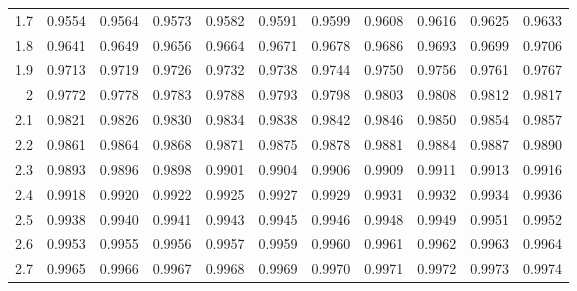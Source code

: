\begin{center}
\begin{minipage}{5in}
\begin{center}
\begin{tabular}{|r|rrrrrrrrrr|}
	\cellcolor{lightgray}1.7	&\cellcolor{lightgray}	0.9554	&\cellcolor{lightgray}	0.9564	&\cellcolor{lightgray}	0.9573	&\cellcolor{lightgray}	0.9582	&\cellcolor{lightgray}	0.9591	&\cellcolor{lightgray}	0.9599	&\cellcolor{lightgray}	0.9608	&\cellcolor{lightgray}	0.9616	&\cellcolor{lightgray}	0.9625	&\cellcolor{lightgray}	0.9633	\\
	\cellcolor{lightgray}1.8	&\cellcolor{lightgray}	0.9641	&\cellcolor{lightgray}	0.9649	&\cellcolor{lightgray}	0.9656	&\cellcolor{lightgray}	0.9664	&\cellcolor{lightgray}	0.9671	&\cellcolor{lightgray}	0.9678	&\cellcolor{lightgray}	0.9686	&\cellcolor{lightgray}	0.9693	&\cellcolor{lightgray}	0.9699	&\cellcolor{lightgray}	0.9706	\\
	\cellcolor{lightgray}1.9	&\cellcolor{lightgray}	0.9713	&\cellcolor{lightgray}	0.9719	&\cellcolor{lightgray}	0.9726	&\cellcolor{lightgray}	0.9732	&\cellcolor{lightgray}	0.9738	&\cellcolor{lightgray}	0.9744	&\cellcolor{lightgray}	0.9750	&\cellcolor{lightgray}	0.9756	&\cellcolor{lightgray}	0.9761	&\cellcolor{lightgray}	0.9767	\\
	2	&	0.9772	&	0.9778	&	0.9783	&	0.9788	&	0.9793	&	0.9798	&	0.9803	&	0.9808	&	0.9812	&	0.9817	\\
	2.1	&	0.9821	&	0.9826	&	0.9830	&	0.9834	&	0.9838	&	0.9842	&	0.9846	&	0.9850	&	0.9854	&	0.9857	\\
	2.2	&	0.9861	&	0.9864	&	0.9868	&	0.9871	&	0.9875	&	0.9878	&	0.9881	&	0.9884	&	0.9887	&	0.9890	\\
	2.3	&	0.9893	&	0.9896	&	0.9898	&	0.9901	&	0.9904	&	0.9906	&	0.9909	&	0.9911	&	0.9913	&	0.9916	\\
	2.4	&	0.9918	&	0.9920	&	0.9922	&	0.9925	&	0.9927	&	0.9929	&	0.9931	&	0.9932	&	0.9934	&	0.9936	\\
	\cellcolor{lightgray}2.5	&\cellcolor{lightgray}	0.9938	&\cellcolor{lightgray}	0.9940	&\cellcolor{lightgray}	0.9941	&\cellcolor{lightgray}	0.9943	&\cellcolor{lightgray}	0.9945	&\cellcolor{lightgray}	0.9946	&\cellcolor{lightgray}	0.9948	&\cellcolor{lightgray}	0.9949	&\cellcolor{lightgray}	0.9951	&\cellcolor{lightgray}	0.9952	\\
	\cellcolor{lightgray}2.6	&\cellcolor{lightgray}	0.9953	&\cellcolor{lightgray}	0.9955	&\cellcolor{lightgray}	0.9956	&\cellcolor{lightgray}	0.9957	&\cellcolor{lightgray}	0.9959	&\cellcolor{lightgray}	0.9960	&\cellcolor{lightgray}	0.9961	&\cellcolor{lightgray}	0.9962	&\cellcolor{lightgray}	0.9963	&\cellcolor{lightgray}	0.9964	\\
	\cellcolor{lightgray}2.7	&\cellcolor{lightgray}	0.9965	&\cellcolor{lightgray}	0.9966	&\cellcolor{lightgray}	0.9967	&\cellcolor{lightgray}	0.9968	&\cellcolor{lightgray}	0.9969	&\cellcolor{lightgray}	0.9970	&\cellcolor{lightgray}	0.9971	&\cellcolor{lightgray}	0.9972	&\cellcolor{lightgray}	0.9973	&\cellcolor{lightgray}	0.9974	\\

\end{tabular}
\end{center}
\end{minipage}
\end{center}
